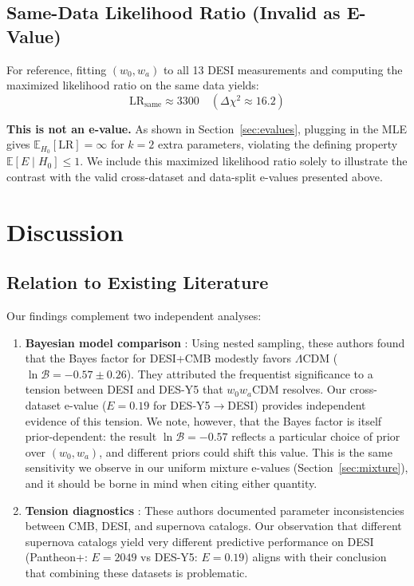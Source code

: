 \documentclass[11pt,a4paper]{article}
\newcommand{\E}{\mathbb{E}}
\newcommand{\LCDM}{$\Lambda$CDM}
\begin{document}
\subsection{Same-Data Likelihood Ratio (Invalid as E-Value)}
\label{sec:samedata}

For reference, fitting $(w_0, w_a)$ to all 13 DESI measurements and computing the maximized likelihood ratio on the same data yields:
\begin{equation}
\text{LR}_{\text{same}} \approx 3300 \quad (\Delta\chi^2 \approx 16.2)
\end{equation}

\textbf{This is not an e-value.} As shown in Section~\ref{sec:evalues}, plugging in the MLE gives $\E_{H_0}[\text{LR}] = \infty$ for $k=2$ extra parameters, violating the defining property $\E[E \mid H_0] \leq 1$. We include this maximized likelihood ratio solely to illustrate the contrast with the valid cross-dataset and data-split e-values presented above.

\section{Discussion}
\label{sec:discussion}

\subsection{Relation to Existing Literature}

Our findings complement two independent analyses:

\begin{enumerate}
    \item \textbf{Bayesian model comparison} \citep{OngBayesian2025}: Using nested sampling, these authors found that the Bayes factor for DESI+CMB modestly favors \LCDM{} ($\ln \mathcal{B} = -0.57 \pm 0.26$). They attributed the frequentist significance to a tension between DESI and DES-Y5 that $w_0w_a$CDM resolves. Our cross-dataset e-value ($E = 0.19$ for DES-Y5$\rightarrow$DESI) provides independent evidence of this tension. We note, however, that the Bayes factor is itself prior-dependent: the result $\ln \mathcal{B} = -0.57$ reflects a particular choice of prior over $(w_0, w_a)$, and different priors could shift this value. This is the same sensitivity we observe in our uniform mixture e-values (Section~\ref{sec:mixture}), and it should be borne in mind when citing either quantity.

    \item \textbf{Tension diagnostics} \citep{WangMota2025}: These authors documented parameter inconsistencies between CMB, DESI, and supernova catalogs. Our observation that different supernova catalogs yield very different predictive performance on DESI (Pantheon+: $E = 2049$ vs DES-Y5: $E = 0.19$) aligns with their conclusion that combining these datasets is problematic.
\end{enumerate}
\end{document}
